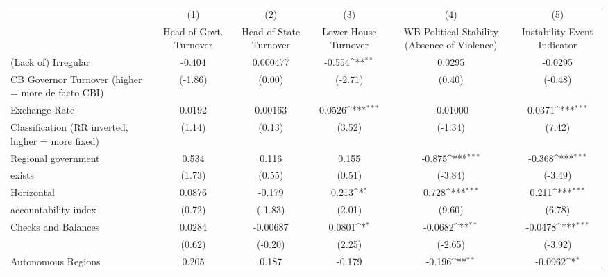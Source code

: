 {
\def\sym#1{\ifmmode^{#1}\else\(^{#1}\)\fi}
\begin{tabular}{l*{5}{c}}
\hline\hline
                    &\multicolumn{1}{c}{(1)}&\multicolumn{1}{c}{(2)}&\multicolumn{1}{c}{(3)}&\multicolumn{1}{c}{(4)}&\multicolumn{1}{c}{(5)}\\
                    &\multicolumn{1}{c}{Head of Govt. Turnover}&\multicolumn{1}{c}{Head of State Turnover}&\multicolumn{1}{c}{Lower House Turnover}&\multicolumn{1}{c}{WB Political Stability (Absence of Violence)}&\multicolumn{1}{c}{Instability Event Indicator}\\
\hline
(Lack of) Irregular &      -0.404         &    0.000477         &      -0.554\sym{**} &      0.0295         &     -0.0295         \\
CB Governor Turnover (higher = more de facto CBI)&     (-1.86)         &      (0.00)         &     (-2.71)         &      (0.40)         &     (-0.48)         \\
[1em]
Exchange Rate       &      0.0192         &     0.00163         &      0.0526\sym{***}&    -0.01000         &      0.0371\sym{***}\\
Classification (RR inverted, higher = more fixed)&      (1.14)         &      (0.13)         &      (3.52)         &     (-1.34)         &      (7.42)         \\
[1em]
Regional government &       0.534         &       0.116         &       0.155         &      -0.875\sym{***}&      -0.368\sym{***}\\
exists              &      (1.73)         &      (0.55)         &      (0.51)         &     (-3.84)         &     (-3.49)         \\
[1em]
Horizontal          &      0.0876         &      -0.179         &       0.213\sym{*}  &       0.728\sym{***}&       0.211\sym{***}\\
accountability index&      (0.72)         &     (-1.83)         &      (2.01)         &      (9.60)         &      (6.78)         \\
[1em]
Checks and Balances &      0.0284         &    -0.00687         &      0.0801\sym{*}  &     -0.0682\sym{**} &     -0.0478\sym{***}\\
                    &      (0.62)         &     (-0.20)         &      (2.25)         &     (-2.65)         &     (-3.92)         \\
[1em]
Autonomous Regions  &       0.205         &       0.187         &      -0.179         &      -0.196\sym{**} &     -0.0962\sym{*}  \\

\end{tabular}}
